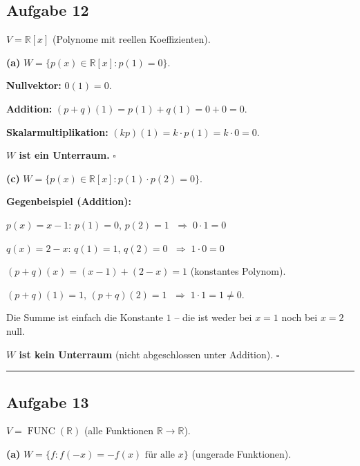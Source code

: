\documentclass[a4paper,12pt]{article}
\begin{document}
\subsection*{Aufgabe 12}

$V = \mathbb{R}[x]$ (Polynome mit reellen Koeffizienten).

\medskip

\textbf{(a)} $W = \{p(x) \in \mathbb{R}[x] : p(1) = 0\}$.

\textbf{Nullvektor:} $0(1) = 0$. \;\checkmark

\textbf{Addition:}
$(p+q)(1) = p(1) + q(1) = 0 + 0 = 0$. \;\checkmark

\textbf{Skalarmultiplikation:}
$(kp)(1) = k \cdot p(1) = k \cdot 0 = 0$. \;\checkmark

\textbf{$W$ ist ein Unterraum.} $\square$

\bigskip

\textbf{(c)} $W = \{p(x) \in \mathbb{R}[x] : p(1) \cdot p(2) = 0\}$.

\textbf{Gegenbeispiel (Addition):}

$p(x) = x - 1$: \;$p(1) = 0$, $p(2) = 1$ $\;\Rightarrow\; 0 \cdot 1 = 0$ \;\checkmark

$q(x) = 2 - x$: \;$q(1) = 1$, $q(2) = 0$ $\;\Rightarrow\; 1 \cdot 0 = 0$ \;\checkmark

$(p+q)(x) = (x-1) + (2-x) = 1$ \;(konstantes Polynom).

$(p{+}q)(1) = 1$, \;$(p{+}q)(2) = 1$
$\;\Rightarrow\; 1 \cdot 1 = 1 \neq 0$.

Die Summe ist einfach die Konstante $1$ -- die ist weder bei $x=1$ noch bei $x=2$ null.

\textbf{$W$ ist kein Unterraum} (nicht abgeschlossen unter Addition). $\square$

\bigskip
\hrule
\bigskip

\subsection*{Aufgabe 13}

$V = \operatorname{FUNC}(\mathbb{R})$ (alle Funktionen $\mathbb{R} \to \mathbb{R}$).

\medskip

\textbf{(a)} $W = \{f : f(-x) = -f(x) \text{ f\"ur alle } x\}$ \;(ungerade Funktionen).
\end{document}
